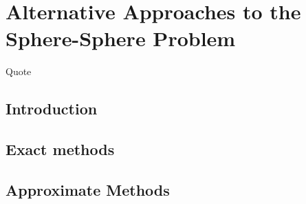 

\chapter[Alternative Approaches to the Sphere-Sphere Problem][Alternative Approaches to the Sphere-Sphere Problem]{Alternative Approaches to the Sphere-Sphere Problem}

Quote

\section{Introduction}

\section{Exact methods}

\section{Approximate Methods}